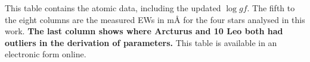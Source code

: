 \documentclass[a4paper,fleqn,usenatbib]{mnras}
\begin{document}
\begin{onecolumn}
\begin{table}
    \vspace{1ex}

    \raggedright This table contains the atomic data, including the updated $\log \mathit{gf}$. The fifth to
                the eight columns are the measured EWs in m\AA{} for the four stars analysed in this
                work. {\bf The last column shows where Arcturus and 10 Leo both had outliers in the
                derivation of parameters.} This table is available in an electronic form online.

   \end{table}
 \end{onecolumn}







\bsp	%
\label{lastpage}
\end{document}
